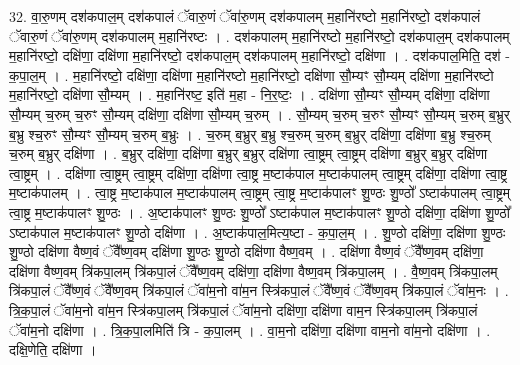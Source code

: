 \documentclass[17pt]{extarticle}
\begin{document}
32. वा॒रु॒णम् दश॑कपाल॒म् दश॑कपालं ॅवारु॒णं ॅवा॑रु॒णम् दश॑कपालम् म॒हानि॑रष्टो म॒हानि॑रष्टो॒ दश॑कपालं ॅवारु॒णं ॅवा॑रु॒णम् दश॑कपालम् म॒हानि॑रष्टः । . दश॑कपालम् म॒हानि॑रष्टो म॒हानि॑रष्टो॒ दश॑कपाल॒म् दश॑कपालम् म॒हानि॑रष्टो॒ दक्षि॑णा॒ दक्षि॑णा म॒हानि॑रष्टो॒ दश॑कपाल॒म् दश॑कपालम् म॒हानि॑रष्टो॒ दक्षि॑णा । . दश॑कपाल॒मिति॒ दश॑ - क॒पा॒ल॒म् । . म॒हानि॑रष्टो॒ दक्षि॑णा॒ दक्षि॑णा म॒हानि॑रष्टो म॒हानि॑रष्टो॒ दक्षि॑णा सौ॒म्यꣳ सौ॒म्यम् दक्षि॑णा म॒हानि॑रष्टो म॒हानि॑रष्टो॒ दक्षि॑णा सौ॒म्यम् । . म॒हानि॑रष्ट॒ इति॑ म॒हा - नि॒र॒ष्टः॒ । . दक्षि॑णा सौ॒म्यꣳ सौ॒म्यम् दक्षि॑णा॒ दक्षि॑णा सौ॒म्यम् च॒रुम् च॒रुꣳ सौ॒म्यम् दक्षि॑णा॒ दक्षि॑णा सौ॒म्यम् च॒रुम् । . सौ॒म्यम् च॒रुम् च॒रुꣳ सौ॒म्यꣳ सौ॒म्यम् च॒रुम् ब॒भ्रुर् ब॒भ्रु श्च॒रुꣳ सौ॒म्यꣳ सौ॒म्यम् च॒रुम् ब॒भ्रुः । . च॒रुम् ब॒भ्रुर् ब॒भ्रु श्च॒रुम् च॒रुम् ब॒भ्रुर् दक्षि॑णा॒ दक्षि॑णा ब॒भ्रु श्च॒रुम् च॒रुम् ब॒भ्रुर् दक्षि॑णा । . ब॒भ्रुर् दक्षि॑णा॒ दक्षि॑णा ब॒भ्रुर् ब॒भ्रुर् दक्षि॑णा त्वा॒ष्ट्रम् त्वा॒ष्ट्रम् दक्षि॑णा ब॒भ्रुर् ब॒भ्रुर् दक्षि॑णा त्वा॒ष्ट्रम् । . दक्षि॑णा त्वा॒ष्ट्रम् त्वा॒ष्ट्रम् दक्षि॑णा॒ दक्षि॑णा त्वा॒ष्ट्र म॒ष्टाक॑पाल म॒ष्टाक॑पालम् त्वा॒ष्ट्रम् दक्षि॑णा॒ दक्षि॑णा त्वा॒ष्ट्र म॒ष्टाक॑पालम् । . त्वा॒ष्ट्र म॒ष्टाक॑पाल म॒ष्टाक॑पालम् त्वा॒ष्ट्रम् त्वा॒ष्ट्र म॒ष्टाक॑पालꣳ शु॒ण्ठः शु॒ण्ठो᳚ ऽष्टाक॑पालम् त्वा॒ष्ट्रम् त्वा॒ष्ट्र म॒ष्टाक॑पालꣳ शु॒ण्ठः । . अ॒ष्टाक॑पालꣳ शु॒ण्ठः शु॒ण्ठो᳚ ऽष्टाक॑पाल म॒ष्टाक॑पालꣳ शु॒ण्ठो दक्षि॑णा॒ दक्षि॑णा शु॒ण्ठो᳚ ऽष्टाक॑पाल म॒ष्टाक॑पालꣳ शु॒ण्ठो दक्षि॑णा । . अ॒ष्टाक॑पाल॒मित्य॒ष्टा - क॒पा॒ल॒म् । . शु॒ण्ठो दक्षि॑णा॒ दक्षि॑णा शु॒ण्ठः शु॒ण्ठो दक्षि॑णा वैष्ण॒वं ॅवै᳚ष्ण॒वम् दक्षि॑णा शु॒ण्ठः शु॒ण्ठो दक्षि॑णा वैष्ण॒वम् । . दक्षि॑णा वैष्ण॒वं ॅवै᳚ष्ण॒वम् दक्षि॑णा॒ दक्षि॑णा वैष्ण॒वम् त्रि॑कपा॒लम् त्रि॑कपा॒लं ॅवै᳚ष्ण॒वम् दक्षि॑णा॒ दक्षि॑णा वैष्ण॒वम् त्रि॑कपा॒लम् । . वै॒ष्ण॒वम् त्रि॑कपा॒लम् त्रि॑कपा॒लं ॅवै᳚ष्ण॒वं ॅवै᳚ष्ण॒वम् त्रि॑कपा॒लं ॅवा॑म॒नो वा॑म॒न स्त्रि॑कपा॒लं ॅवै᳚ष्ण॒वं ॅवै᳚ष्ण॒वम् त्रि॑कपा॒लं ॅवा॑म॒नः । . त्रि॒क॒पा॒लं ॅवा॑म॒नो वा॑म॒न स्त्रि॑कपा॒लम् त्रि॑कपा॒लं ॅवा॑म॒नो दक्षि॑णा॒ दक्षि॑णा वाम॒न स्त्रि॑कपा॒लम् त्रि॑कपा॒लं ॅवा॑म॒नो दक्षि॑णा । . त्रि॒क॒पा॒लमिति॑ त्रि - क॒पा॒लम् । . वा॒म॒नो दक्षि॑णा॒ दक्षि॑णा वाम॒नो वा॑म॒नो दक्षि॑णा । . दक्षि॒णेति॒ दक्षि॑णा । \newline
\pagebreak
{}
\end{document}
